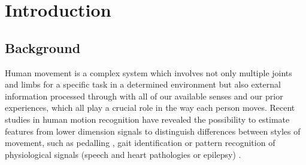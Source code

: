 
\chapter{Introduction}  %


\graphicspath{{figs/chapter1/PDF/}}

%


\section{Background}
Human movement is a complex system which involves not only multiple
joints and limbs for a specific task in a determined environment
but also external information processed through with all of our available senses 
and our prior experiences, which all play a crucial role in the way each person moves.
Recent studies in human motion recognition have revealed the possibility to estimate
features from lower dimension signals to distinguish differences between 
styles of movement, such as pedalling \citep{Quintana-Duque2012, Quintana-Duque2016}, 
gait identification \citep{sama2013, frank2010} 
or pattern recognition of physiological signals (speech and heart pathologies or epilepsy) \citep{gomezgarcia2014}.

